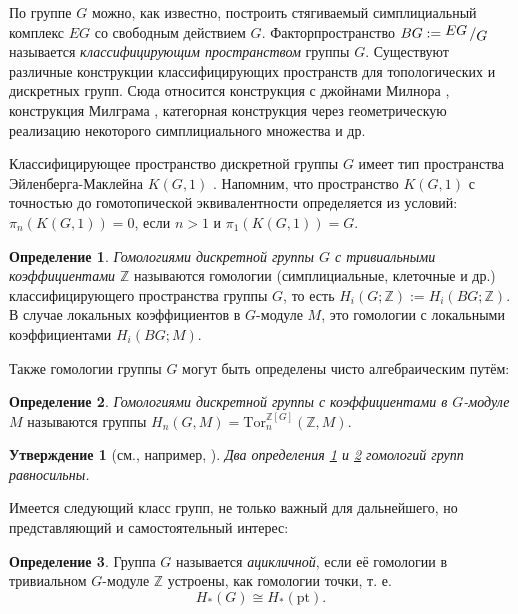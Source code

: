 \documentclass[14pt, dvipsnames, twoside]{extarticle}
\newtheorem{statement}{Утверждение}
\theoremstyle{definition}
\newtheorem{defi}{Определение}
\theoremstyle{remark}
\newcommand{\factor}[2]{{\raisebox{.2em}{$#1$}\left/\raisebox{-.2em}{$#2$}\right.}}
\begin{document}
По группе $G$ можно, как известно, построить стягиваемый симплициальный комплекс $EG$ со свободным действием $G$. Факторпространство $BG:=\factor{EG}{G}$ называется {\it классифицирующим пространством} группы $G$. Существуют различные конструкции классифицирующих пространств для топологических и дискретных групп. Сюда относится конструкция с джойнами Милнора \cite{MilnorBG}, конструкция Милграма \cite{Milgram}, категорная конструкция через геометрическую реализацию некоторого симплициального множества \cite{Jardine} и др. 

Классифицирующее пространство дискретной группы $G$ имеет тип пространства Эйленберга-Маклейна $K(G, 1)$ \cite{Hatcher}. Напомним, что пространство $K(G, 1)$ с точностью до гомотопической эквивалентности определяется из условий:\\ $\pi_n(K(G, 1)) = 0$, если $n > 1$ и $\pi_1(K(G, 1)) = G$. 

\begin{defi}\label{group_homology_BG}
{\it Гомологиями дискретной группы $G$ с тривиальными коэффициентами $\mathbb{Z}$} называются гомологии (симплициальные, клеточные и др.) классифицирующего пространства группы $G$, то есть $H_i(G; \mathbb{Z}):=H_i(BG; \mathbb{Z})$. В случае локальных коэффициентов в $G$-модуле $M$, это гомологии с локальными коэффициентами $H_i(BG; M)$.
\end{defi}

Также гомологии группы $G$ могут быть определены чисто алгебраическим путём:

\begin{defi}\label{group_homology_resolution}
{\it Гомологиями дискретной группы с коэффициентами в $G$-модуле $M$} называются группы $H_n(G, M)=\mathrm{Tor}^{\mathbb{Z}[G]}_n(\mathbb{Z}, M)$.
\end{defi}


\begin{statement}[см., например, \cite{Brown}]
Два определения \ref{group_homology_BG} и \ref{group_homology_resolution} гомологий групп равносильны.
\end{statement}


 Имеется следующий класс групп, не только важный для дальнейшего, но представляющий и самостоятельный интерес:
 
 
\begin{defi}
Группа $G$ называется {\it ацикличной}, если её гомологии в тривиальном $G$-модуле $\mathbb{Z}$ устроены, как гомологии точки, т. е. $$H_\ast(G) \cong H_\ast(\mathrm{pt}).$$
\end{defi}
 
\end{document}
